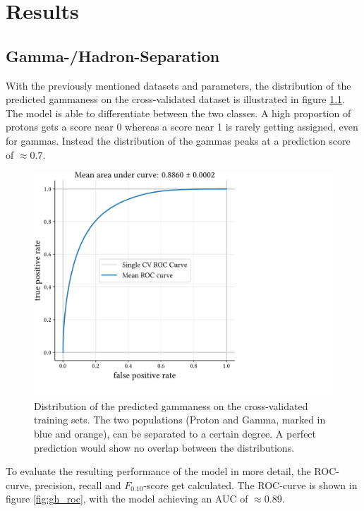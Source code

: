 \chapter{Results}\label{Results}


\section{Gamma-/Hadron-Separation}\label{Gamma-/Hadron-Separation}

With the previously mentioned datasets and parameters, the distribution of the predicted gammaness
on the cross-validated dataset is illustrated in figure \ref{fig:gh_sep}.
The model is able to differentiate between the two classes. A high proportion of protons gets a
score near 0 whereas a score near 1 is rarely getting assigned, even for gammas.
Instead the distribution of the gammas peaks at a prediction score of $\approx 0.7$.

\begin{figure}
    \centering
    \captionsetup{width=0.9\linewidth}
    \includegraphics[page=2, width=.9\textwidth]{../analysis/plots/cross_val_sep_perf_plot.pdf}
    \caption{Distribution of the predicted gammaness on the cross-validated training sets.
	    The two populations (Proton and Gamma, marked in blue and orange), can be separated 
	    to a certain degree.
        A perfect prediction would show no overlap between the distributions.}
    \label{fig:gh_sep}
\end{figure}

To evaluate the resulting performance of the model in more detail, the ROC-curve, precision, recall and
$F_{\num{0.10}}$-score get calculated. 
The ROC-curve is shown in figure \ref{fig:gh_roc}, with the model achieving an AUC of 
$\approx \num{0.89}$.


